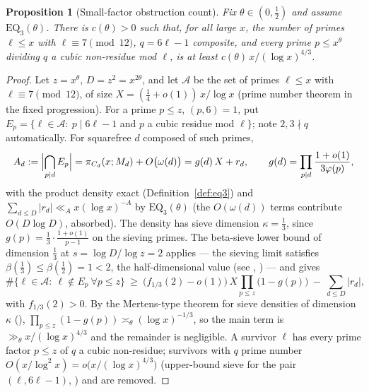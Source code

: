 \documentclass[11pt]{article}
\theoremstyle{plain}
\newtheorem{proposition}[theorem]{Proposition}
\theoremstyle{definition}
\theoremstyle{remark}
\begin{document}
\begin{proposition}[Small-factor obstruction count]
\label{prop:small-factor-sieve}
Fix $\theta\in(0,\tfrac12)$ and assume $\mathrm{EQ}_3(\theta)$.  There
is $c(\theta)>0$ such that, for all large $x$, the number of primes
$\ell\le x$ with $\ell\equiv7\pmod{12}$, $q=6\ell-1$ composite, and
every prime $p\le x^{\theta}$ dividing $q$ a cubic non-residue mod
$\ell$, is at least $c(\theta)\,x/(\log x)^{4/3}$.
\end{proposition}

\begin{proof}
Let $z=x^\theta$, $D=z^2=x^{2\theta}$, and let $\mathcal A$ be the set
of primes $\ell\le x$ with $\ell\equiv7\pmod{12}$, of size
$X=(\tfrac14+o(1))\,x/\log x$ (prime number theorem in the fixed
progression).  For a prime $p\le z$, $(p,6)=1$, put
$E_p=\{\ell\in\mathcal A:\ p\mid6\ell-1$ and $p$ a cubic residue mod
$\ell\}$; note $2,3\nmid q$ automatically.  For squarefree $d$ composed
of such primes,
\[
  A_d:=\Bigl|\bigcap_{p\mid d}E_p\Bigr|
      =\pi_{C_d}(x;M_d)+O\bigl(\omega(d)\bigr)
      =g(d)\,X+r_d,\qquad
  g(d)=\prod_{p\mid d}\frac{1+o(1)}{3\varphi(p)},
\]
with the product density exact (Definition~\ref{def:eq3}) and
$\sum_{d\le D}|r_d|\ll_A x(\log x)^{-A}$ by $\mathrm{EQ}_3(\theta)$
(the $O(\omega(d))$ terms contribute $O(D\log D)$, absorbed).  The
density has sieve dimension $\kappa=\tfrac13$, since
$g(p)=\tfrac13\cdot\tfrac{1+o(1)}{p-1}$ on the sieving primes.  The
beta-sieve lower bound of dimension $\tfrac13$ at
$s=\log D/\log z=2$ applies --- the sieving limit satisfies
$\beta(\tfrac13)\le\beta(\tfrac12)=1<2$, the half-dimensional value
(see \cite[Ch.~11]{FI10}, \cite{HR74}) --- and gives
\[
  \#\{\ell\in\mathcal A:\ \ell\notin E_p\ \forall p\le z\}
  \ \ge\ \bigl(f_{1/3}(2)-o(1)\bigr)\,X\prod_{p\le z}\bigl(1-g(p)\bigr)
  \ -\ \sum_{d\le D}|r_d|,
\]
with $f_{1/3}(2)>0$.  By the Mertens-type theorem for sieve densities
of dimension $\kappa$ (\cite{HR74}),
$\prod_{p\le z}(1-g(p))\asymp_\theta(\log x)^{-1/3}$, so the main term
is $\gg_\theta x/(\log x)^{4/3}$ and the remainder is negligible.  A
survivor $\ell$ has every prime factor $p\le z$ of $q$ a cubic
non-residue; survivors with $q$ prime number
$O(x/\log^2x)=o\bigl(x/(\log x)^{4/3}\bigr)$ (upper-bound sieve for
the pair $(\ell,6\ell-1)$, \cite{HR74}) and are removed.
\end{proof}
\end{document}
